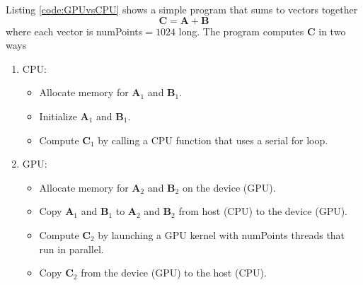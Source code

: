 Listing \ref{code:GPUvsCPU} shows a simple program that sums to vectors together
\begin{equation}
\mathbf{C} = \mathbf{A} + \mathbf{B}
\end{equation}
where each vector is numPoints$ = 1024$ long.
The program computes $\mathbf{C}$ in two ways
\begin{enumerate}
  \item CPU: 
     \begin{itemize}
     \item Allocate memory for $\mathbf{A}_1$ and $\mathbf{B}_1$.
     \item Initialize $\mathbf{A}_1$ and $\mathbf{B}_1$.
     \item Compute $\mathbf{C}_1$ by calling a CPU function that uses a serial for loop.
   \end{itemize}
  \item GPU: 
     \begin{itemize}
     \item Allocate memory for $\mathbf{A}_2$ and $\mathbf{B}_2$ on the device (GPU).
     \item Copy $\mathbf{A}_1$ and $\mathbf{B}_1$ to $\mathbf{A}_2$ and $\mathbf{B}_2$ from host (CPU) to the device (GPU).
     \item Compute $\mathbf{C}_2$ by launching a GPU kernel with numPoints threads that run in parallel.
     \item Copy $\mathbf{C}_2$ from the device (GPU) to the host (CPU).
   \end{itemize}
\end{enumerate}

